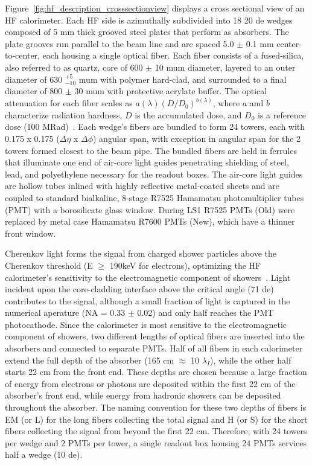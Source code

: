 Figure~\ref{fig:hf_description_crosssectionview} displays a cross sectional view of an HF calorimeter. Each HF side is azimuthally subdivided into 18 20 de wedges composed of 5 mm thick grooved steel plates that perform as absorbers. The plate grooves run parallel to the beam line and are spaced 5.0 $\pm$ 0.1 mm center-to-center, each housing a single optical fiber. Each fiber consists of a fused-silica, also referred to as quartz, core of 600 $\pm$ 10 mum diameter, layered to an outer diameter of 630 $^{+5}_{-10}$ mum with polymer hard-clad, and surrounded to a final diameter of 800 $\pm$ 30 mum with protective acrylate buffer. The optical attenuation for each fiber scales as $a(\lambda)(D/D_0)^{b(\lambda)}$, where $a$ and $b$ characterize radiation hardness, $D$ is the accumulated dose, and $D_0$ is a reference dose (100 MRad)~\cite{HFCC:2008}. Each
wedge's fibers are bundled to form 24 towers, each with 0.175 x 0.175 ($\Delta\eta$ x $\Delta\phi$) angular span, with exception in angular span for the 2 towers formed closest to the beam pipe. The bundled fibers are held in ferrules that illuminate one end of air-core light guides penetrating shielding of steel, lead, and polyethylene necessary for the readout boxes. The air-core light
guides are hollow tubes inlined with highly reflective metal-coated sheets and are coupled to standard bialkaline, 8-stage R7525 Hamamatsu photomultiplier tubes (PMT) with a borosilicate glass window. During LS1 R7525 PMTs (Old) were replaced by metal case Hamamatsu R7600 PMTs (New), which have a thinner front window.

Cherenkov light forms the signal from charged shower particles above the Cherenkov threshold (E $\ge$ 190keV for electrons), optimizing the HF calorimeter's sensitivity to the electromagnetic component of showers~\cite{Akchurin:2955}. Light incident upon the core-cladding interface above the critical angle (71 de) contributes to the signal, although a small fraction of light is captured in the numerical aperature (NA = 0.33 $\pm$ 0.02) and only half reaches the PMT photocathode. Since the calorimeter is most sensitive to the electromagnetic component of showers, two different lengths of optical fibers are inserted into the absorbers and connected to separate PMTs. Half of all fibers in each calorimeter extend the full depth of the absorber (165 cm $\approx$ 10 $\lambda_I$), while the other half starts 22 cm from the front end. These depths are chosen because a large fraction of energy from electrons or photons are deposited within the first 22 cm of the absorber's front end, while energy from hadronic showers can be deposited throughout the absorber. The naming convention for these two depths of fibers is EM (or L) for the long fibers collecting the total signal and H (or S) for the short fibers collecting the signal from beyond the first 22 cm. Therefore, with 24 towers per wedge
and 2 PMTs per tower, a single readout box housing 24 PMTs services half a wedge (10 de).

